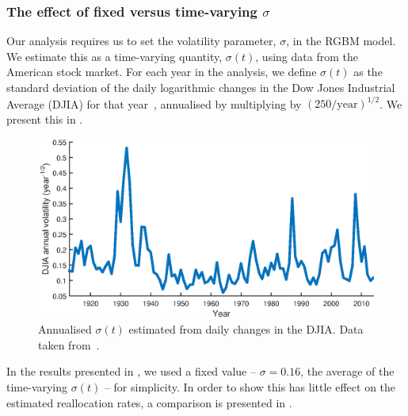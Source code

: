 \clearpage

\subsubsection{The effect of fixed versus time-varying $\sigma$}\label{app:fixed_sig}

Our analysis requires us to set the volatility parameter, $\sigma$, in the RGBM model. We estimate this as a time-varying quantity, $\sigma \left(t\right)$, using data from the American stock market. For each year in the analysis, we define $\sigma \left(t\right)$ as the standard deviation of the daily logarithmic changes in the Dow Jones Industrial Average (DJIA) for that year~\cite{Quandl2016}, annualised by multiplying by $\left(250/\text{year}\right)^{1/2}$. We present this in .

\begin{figure}[!htb]
\centering
\includegraphics[width=1.0\textwidth] {./chapter_3/figs/DOW.eps}
\caption{Annualised $\sigma\left(t\right)$ estimated from daily changes in the DJIA. Data taken from~\cite{Quandl2016}.}
\end{figure}

In the results presented in , we used a fixed value -- $\sigma=0.16$, the average of the time-varying $\sigma \left(t\right)$ -- for simplicity. In order to show this has little effect on the estimated reallocation rates, a comparison is presented in .


